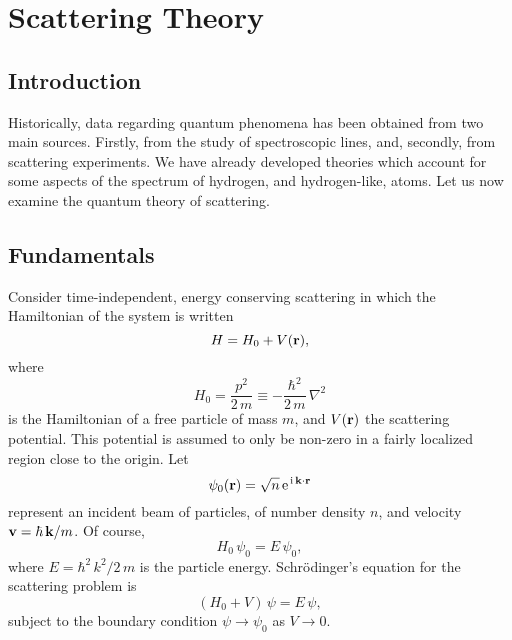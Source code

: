 \chapter{Scattering Theory}\label{s15}
\section{Introduction}
Historically, data regarding quantum phenomena has been
obtained from two main sources. Firstly, from the study of spectroscopic
lines, and, secondly, from scattering experiments. We have already developed
theories which account for some aspects of the spectrum of
hydrogen, and hydrogen-like, atoms. Let us now examine the quantum
theory of scattering.

\section{Fundamentals}
Consider time-independent, energy conserving  scattering in which the Hamiltonian
of the system is written
\begin{equation}
H = H_0 + V({\bf r}),
\end{equation}
where
\begin{equation}
H_0 = \frac{p^2}{2\,m} \equiv - \frac{\hbar^2}{2\,m}\,\nabla^2
\end{equation}
is the Hamiltonian of a free particle of mass $m$, and $V({\bf r})$
 the scattering potential. This potential is assumed to  only be
non-zero in a fairly localized region close to the origin. Let
\begin{equation}
\psi_0({\bf r}) = \sqrt{n}\,{\rm e}^{\,{\rm i}\,{\bf k}\cdot {\bf r}}
\end{equation}
represent an incident beam of particles, of number density $n$, and
velocity ${\bf v} = \hbar\,{\bf k}/m$. Of course,
\begin{equation}
H_0\,\psi_0= E\,\psi_0,
\end{equation}
where $E = \hbar^2\,k^2/2\,m$ is the particle energy.
Schr\"{o}dinger's equation for the scattering problem is
\begin{equation}
(H_0+V)\,\psi = E\,\psi,
\end{equation}
subject to the boundary condition $\psi\rightarrow\psi_0$ as $V\rightarrow 0$. 

